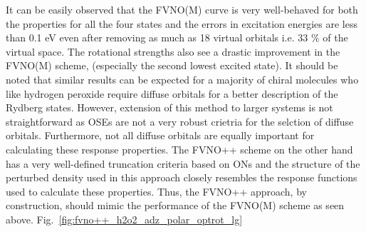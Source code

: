 It can be easily observed that the FVNO(M) curve is very well-behaved for 
both the properties for all the four states and the errors in excitation energies 
are less than 0.1 eV even after removing as much as 18 virtual orbitals i.e. 33 \% of the virtual
space. The rotational strengths also see a drastic improvement in the FVNO(M) scheme,
(especially the second lowest excited state).
It should be noted that similar results can be expected for a majority of chiral molecules who 
like hydrogen peroxide require diffuse orbitals for a better description of the
Rydberg states. However, extension of this method to larger systems is not 
straightforward as OSEs are not a very robust crietria for the selction of diffuse 
orbitals. Furthermore, not all diffuse orbitals are equally important for 
calculating these response properties. The FVNO++ scheme on the other hand has a very well-defined 
truncation criteria based on ONs and the structure of the perturbed density used in this 
approach closely resembles the response functions used to calculate these 
properties. Thus, the FVNO++ approach, by construction, should mimic the performance of the FVNO(M)
scheme as seen above. Fig.~\ref{fig:fvno++_h2o2_adz_polar_optrot_lg} 
